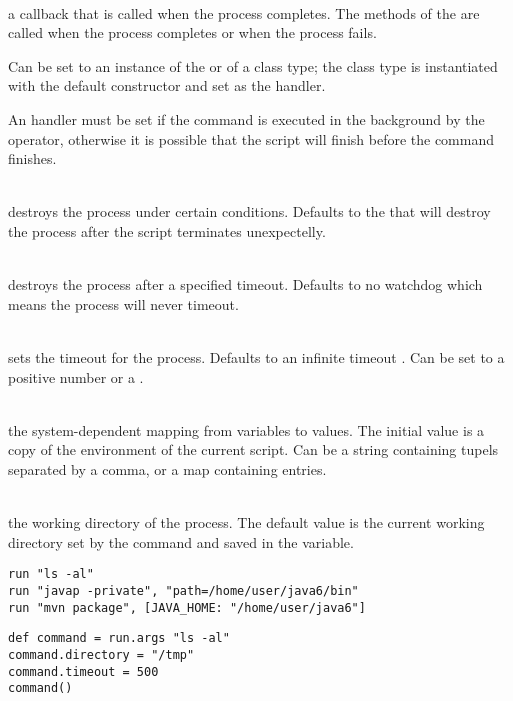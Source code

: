 \begin{asparaitem}
%
\item[\code{handler: ExecuteResultHandler}] \hfill \\
a callback that is called when the process completes. 
The methods of the \cite{executeresulthandler13} 
are called when the process completes or when the process fails.

Can be set to an instance of the  or of a class 
type; the class type is instantiated with the default
constructor and set as the handler.

An handler must be set if the command is executed in the background by the 
operator, otherwise it is possible that the script will finish before the command finishes.
%
\item[\code{destroyer: ProcessDestroyer}] \hfill \\
\cite{processdestroyer13}  destroys the process under certain conditions.
Defaults to the \cite{shutdownhookprocessdestroyer13}
that will destroy the process after the script terminates unexpectelly.
%
\item[\code{watchdog}] \hfill \\
destroys the process after a specified timeout. Defaults to 
no watchdog which means the process will never timeout.
%
\item[\code{timeout: (+)number|duration}] \hfill \\
sets the timeout for the process. Defaults to an infinite 
timeout  . Can be set to a positive
number or a \cite{duration13}.
%
\item[\code{env}] \hfill \\
the system-dependent mapping from variables
to values. The initial value is a copy of the environment of the current
script. Can be a string containing  tupels
separated by a comma, or a map containing  entries.
%
\item[\code{dir}] \hfill \\
the working directory of the process. The default value
is the current working directory set by the  command
and saved in the  variable.
%
\end{asparaitem}

\begin{lstlisting}[style=Groovybash, label={lst:example_run1}, title={
Examples to execute external commands.}]
run "ls -al"
run "javap -private", "path=/home/user/java6/bin"
run "mvn package", [JAVA_HOME: "/home/user/java6"]
\end{lstlisting}

\begin{lstlisting}[style=Groovybash, label={lst:example_run2}, title={
Deleyed execution of external commands.}]
def command = run.args "ls -al"
command.directory = "/tmp"
command.timeout = 500
command()
\end{lstlisting}

